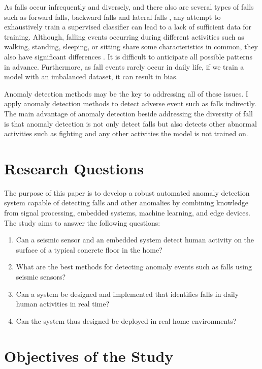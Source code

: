 As falls occur infrequently and diversely, and there also are several types of falls such as forward falls, backward falls and lateral falls \cite{el-bendary_tan_c_pivot_lam_2013}, any attempt to exhaustively train a supervised classifier can lead to a lack of sufficient data for training. Although, falling events occurring during different activities such as walking, standing, sleeping, or sitting share some characteristics in common, they also have significant differences \cite{wang_ellul_azzopardi_2020}. It is difficult to anticipate all possible patterns in advance. Furthermore, as fall events rarely occur in daily life, if we train a model with an imbalanced dataset, it can result in bias.


Anomaly detection methods may be the key to addressing all of these issues. I apply anomaly detection methods to detect adverse event such as falls indirectly. The main advantage of anomaly detection beside addressing the diversity of fall is that anomaly detection is not only detect falls but also detects other abnormal activities such as fighting and any other activities the model is not trained on.


\section{Research Questions}

The purpose of this paper is to develop a robust automated anomaly detection system capable of detecting falls and other anomalies by combining knowledge from signal processing, embedded systems, machine learning, and edge devices. The study aims to answer the following questions:
\begin{enumerate}
    \item Can a seismic sensor and an embedded system detect human activity on the surface of a typical concrete floor in the home?
    \item What are the best methods for detecting anomaly events such as falls using seismic sensors?
    \item Can a system be designed and implemented
          that identifies falls in daily human activities in real time?
    \item Can the system thus designed be deployed in real home environments?
\end{enumerate}

\section{Objectives of the Study}

